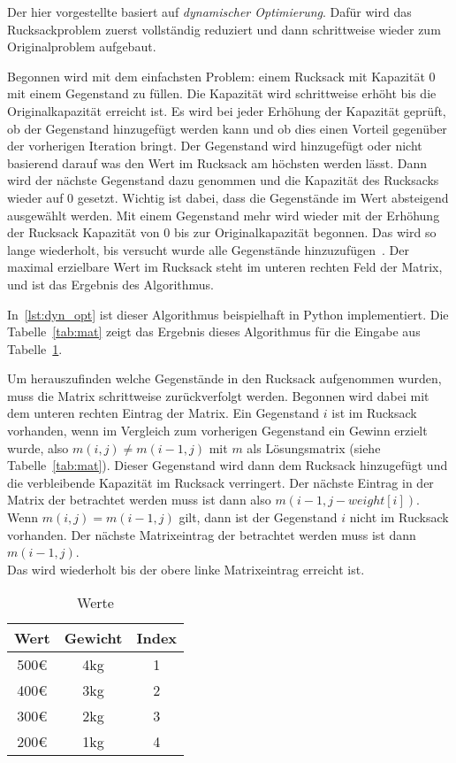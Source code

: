 \documentclass[12pt, a4paper, ngerman]{article}
\begin{document}
Der hier vorgestellte basiert auf \emph{dynamischer Optimierung}.
Dafür wird das Rucksackproblem zuerst vollständig reduziert
und dann schrittweise wieder zum Originalproblem aufgebaut.

Begonnen wird mit dem einfachsten Problem: einem Rucksack mit Kapazität 0 mit einem Gegenstand zu füllen.
Die Kapazität wird schrittweise erhöht bis die Originalkapazität erreicht ist.
Es wird bei jeder Erhöhung der Kapazität geprüft, ob der Gegenstand hinzugefügt werden kann
und ob dies einen Vorteil gegenüber der vorherigen Iteration bringt.
Der Gegenstand wird hinzugefügt oder nicht basierend darauf was den Wert im Rucksack am höchsten werden lässt.
Dann wird der nächste Gegenstand dazu genommen und die Kapazität des Rucksacks wieder auf 0 gesetzt.
Wichtig ist dabei, dass die Gegenstände im Wert absteigend ausgewählt werden.
Mit einem Gegenstand mehr wird wieder mit der Erhöhung der Rucksack Kapazität von 0 bis zur Originalkapazität begonnen.
Das wird so lange wiederholt, bis versucht wurde alle Gegenstände hinzuzufügen~\cite{scheiterhauer2008}.
Der maximal erzielbare Wert im Rucksack steht im unteren rechten Feld der Matrix,
und ist das Ergebnis des Algorithmus.

In~\ref{lst:dyn_opt} ist dieser Algorithmus beispielhaft in Python implementiert.
Die Tabelle~\ref{tab:mat} zeigt das Ergebnis dieses Algorithmus für die Eingabe aus Tabelle~\ref{tab:input}.

Um herauszufinden welche Gegenstände in den Rucksack aufgenommen wurden,
muss die Matrix schrittweise zurückverfolgt werden.
Begonnen wird dabei mit dem unteren rechten Eintrag der Matrix.
Ein Gegenstand \(i\) ist im Rucksack vorhanden,
wenn im Vergleich zum vorherigen Gegenstand ein Gewinn erzielt wurde,
also \(m(i,j)\neq m(i-1,j)\) mit \(m\) als Lösungsmatrix (siehe Tabelle~\ref{tab:mat}).
Dieser Gegenstand wird dann dem Rucksack hinzugefügt
und die verbleibende Kapazität im Rucksack verringert.
Der nächste Eintrag in der Matrix der betrachtet werden muss
ist dann also \(m(i-1,j-weight[i])\).\\
Wenn \(m(i,j) = m(i-1,j)\) gilt,
dann ist der Gegenstand \(i\) nicht im Rucksack vorhanden.
Der nächste Matrixeintrag der betrachtet werden muss ist dann \(m(i-1,j)\).\\
Das wird wiederholt bis der obere linke Matrixeintrag erreicht ist.


\begin{table}
  \renewcommand{\arraystretch}{1.2}
  \centering
  \begin{tabular}{c|c|c}
    Wert & Gewicht & Index \\
    \hline
    500€ & 4kg     & 1     \\
    400€ & 3kg     & 2     \\
    300€ & 2kg     & 3     \\
    200€ & 1kg     & 4
  \end{tabular}
  \caption{Werte}
  \label{tab:input}
\end{table}
\end{document}
